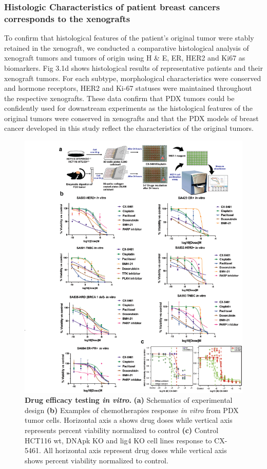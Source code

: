 \subsubsection{Histologic Characteristics of patient breast cancers corresponds to the xenografts}

To confirm that histological features of the patient’s original tumor were stably retained in the xenograft, we conducted a comparative histological analysis of xenograft tumors and tumors of origin using H \& E, ER, HER2 and Ki67 as biomarkers. 
Fig 3.1d shows histological results of representative patients and their xenograft tumors. For each subtype, morphological characteristics were conserved and hormone receptors, HER2 and Ki-67 statuses were maintained throughout the respective xenografts. These data confirm that PDX tumors could be confidently used for downstream experiments as the histological features of the original tumors were conserved in xenografts and that the PDX models of breast cancer developed in this study reflect the characteristics of the original tumors.
\begin{figure}
	\centering
	\includegraphics[width=\textwidth]{Figures/invitro.png}
	\caption[Drug efficacy testing \textit{in vitro} ]
	{\small
	    \textbf{Drug efficacy testing \textit{in vitro}.}
	    \textbf{(a)} Schematics of experimental design
	    \textbf{(b)} Examples of chemotherapies response \textit{in vitro} from PDX tumor cells. Horizontal axis a shows drug doses while vertical axis represents percent viability normalized to control
	    \textbf{(c)} Control HCT116 wt, DNApk KO and lig4 KO cell lines response to CX-5461. All horizontal axis represent drug doses while vertical axis shows percent viability normalized to control.
	}
	\label{fig:invitro}
\end{figure}
